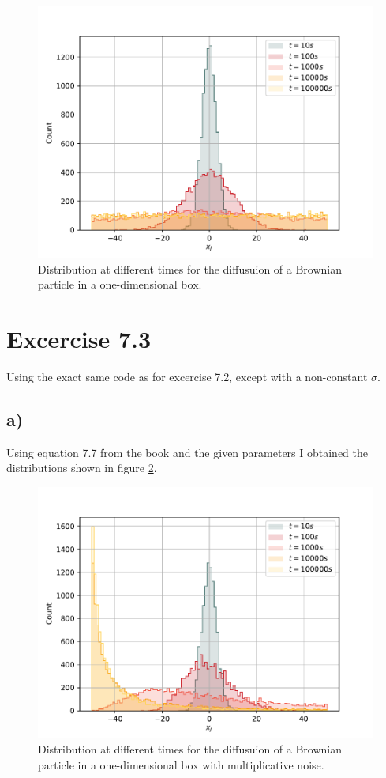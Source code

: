 \documentclass[a4paper, 12pt]{article}
\begin{document}
\begin{figure}[h!]
    \centering
    \includegraphics[width=0.8\linewidth]{../Diffusion-In-Box/diffusion-in-box.pdf}
    \caption{Distribution at different times for the diffusuion of a Brownian particle in a one-dimensional box.}
    \label{fig:diffinbox}
\end{figure}

\newpage

\section*{Excercise 7.3}
Using the exact same code as for excercise 7.2, except with a non-constant $\sigma$.

\subsection*{a)}
Using equation 7.7 from the book and the given parameters I obtained the distributions shown in figure \ref{fig:multnoise}.

\begin{figure}[h!]
    \centering
    \includegraphics[width=0.8\linewidth]{../Multiplicative-Noise/mult_noise.pdf}
    \caption{Distribution at different times for the diffusuion of a Brownian particle in a one-dimensional box with multiplicative noise.}
    \label{fig:multnoise}
\end{figure}
\end{document}
